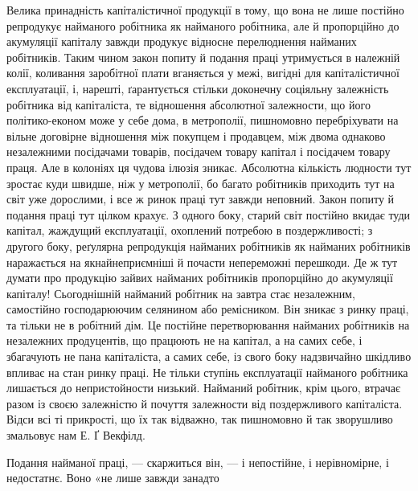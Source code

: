 Велика принадність капіталістичної продукції в тому, що вона не лише постійно репродукує найманого
робітника як найманого робітника, але й пропорційно до акумуляції капіталу завжди продукує відносне
перелюднення найманих робітників.
Таким чином закон попиту й подання праці утримується в належній колії, коливання заробітної плати
вганяється у межі, вигідні для капіталістичної експлуатації, і, нарешті, ґарантується стільки
доконечну соціяльну залежність робітника від
капіталіста, те відношення абсолютної залежности, що його політико-економ може у себе дома, в
метрополії, пишномовно перебріхувати на вільне договірне відношення між покупцем і продавцем, між
двома однаково незалежними посідачами товарів,
посідачем товару капітал і посідачем товару праця. Але в колоніях ця чудова ілюзія зникає. Абсолютна
кількість людности тут зростає куди швидше, ніж у метрополії, бо багато робітників приходить тут на
світ уже дорослими, і все ж ринок праці тут завжди неповний. Закон попиту й подання праці тут цілком
крахує. З одного боку, старий світ постійно вкидає туди капітал, жаждущий експлуатації, охоплений
потребою в
поздержливості; з другого боку, реґулярна репродукція найманих робітників як найманих робітників
наражається на якнайнеприємніші й почасти непереможні перешкоди. Де ж тут думати про продукцію
зайвих найманих робітників пропорційно
до акумуляції капіталу! Сьогоднішній найманий робітник на завтра стає незалежним, самостійно
господарюючим селянином або ремісником. Він зникає з ринку праці, та тільки не в робітний дім. Це
постійне перетворювання найманих робітників на незалежних продуцентів, що працюють не на капітал, а
на самих себе, і збагачують не пана капіталіста, а самих себе, із свого боку надзвичайно шкідливо
впливає на стан
ринку праці. Не тільки ступінь експлуатації найманого робітника лишається до непристойности низький.
Найманий робітник, крім цього, втрачає разом із своєю залежністю й почуття залежности від
поздержливого капіталіста. Відси всі ті прикрості,
що їх так відважно, так пишномовно й так зворушливо змальовує нам Е. Ґ Векфілд.

Подання найманої праці, — скаржиться він, — і непостійне, і нерівномірне, і недостатнє. Воно «не
лише завжди занадто
\parbreak{}  %
